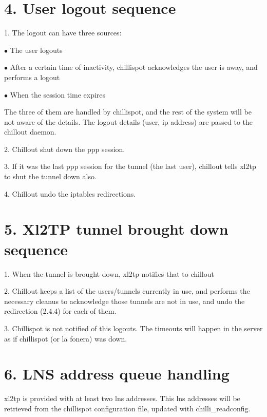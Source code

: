 \section{4. User logout sequence}

\item {1.} The logout can have three sources:
\par \begingroup \narrower
 \item {$\bullet$} The user logouts
 \item {$\bullet$} After a certain time of inactivity, chillispot acknowledges the user
  is away, and performs a logout
 \item {$\bullet$} When the session time expires
\par \endgroup
The three of them are handled by chillispot, and the rest of the system 
will be not aware of the details. The logout details (user, ip address)
are passed to the chillout daemon.

\item {2.} Chillout shut down the ppp session.
\item {3.} If it was the last ppp session for the tunnel (the last user), chillout
tells xl2tp to shut the tunnel down also.
\item {4.} Chillout undo the iptables redirections. 

\section{5. Xl2TP tunnel brought down sequence}

\item {1.} When the tunnel is brought down, xl2tp notifies that to chillout
\item {2.} Chillout keeps a list of the users/tunnels currently in use, and
performs the necessary cleanus to acknowledge those tunnels are not
in use, and undo the redirection (2.4.4) for each of them.
\item {3.} Chillispot is not notified of this logouts. The timeouts will happen
in the server as if chillispot (or la fonera) was down.

\section{6. LNS address queue handling}

xl2tp is provided with at least two lns addresses. This lns addresses will
be retrieved from the chillispot configuration file, updated with
chilli\_readconfig.

